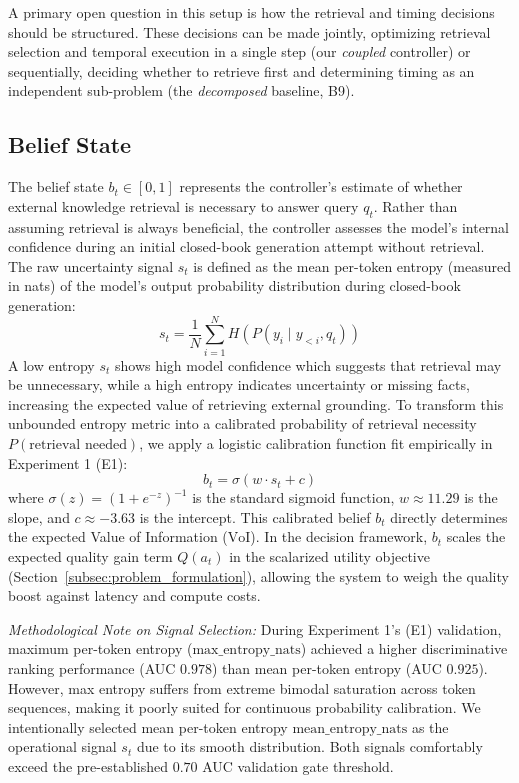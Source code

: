 A primary open question in this setup is how the retrieval and timing decisions should be structured. These decisions can be made jointly, optimizing retrieval selection and temporal execution in a single step (our \textit{coupled} controller) or sequentially, deciding whether to retrieve first and determining timing as an independent sub-problem (the \textit{decomposed} baseline, B9).

\subsection{Belief State}
\label{subsec:belief_state}

The belief state $b_t \in [0, 1]$ represents the controller's estimate of whether external knowledge retrieval is necessary to answer query $q_t$. Rather than assuming retrieval is always beneficial, the controller assesses the model's internal confidence during an initial closed-book generation attempt without retrieval.
The raw uncertainty signal $s_t$ is defined as the mean per-token entropy (measured in nats) of the model's output probability distribution during closed-book generation:
\begin{equation}
s_t = \frac{1}{N} \sum_{i=1}^{N} H(P(y_i \mid y_{<i}, q_t))
\end{equation}
A low entropy $s_t$ shows high model confidence which suggests that retrieval may be unnecessary, while a high entropy indicates uncertainty or missing facts, increasing the expected value of retrieving external grounding.
To transform this unbounded entropy metric into a calibrated probability of retrieval necessity $P(\text{retrieval needed})$, we apply a logistic calibration function fit empirically in Experiment 1 (E1):
\begin{equation}
b_t = \sigma(w \cdot s_t + c)
\end{equation}
where $\sigma(z) = (1 + e^{-z})^{-1}$ is the standard sigmoid function, $w \approx 11.29$ is the slope, and $c \approx -3.63$ is the intercept. This calibrated belief $b_t$ directly determines the expected Value of Information ($\text{VoI}$). In the decision framework, $b_t$ scales the expected quality gain term $Q(a_t)$ in the scalarized utility objective (Section~\ref{subsec:problem_formulation}), allowing the system to weigh the quality boost against latency and compute costs.

\textit{Methodological Note on Signal Selection:} During Experiment 1's (E1) validation, maximum per-token entropy ($\text{max\_entropy\_nats}$) achieved a higher discriminative ranking performance (AUC $0.978$) than mean per-token entropy (AUC $0.925$).
However, max entropy suffers from extreme bimodal saturation across token sequences, making it poorly suited for continuous probability calibration.
We intentionally selected mean per-token entropy $\text{mean\_entropy\_nats}$ as the operational signal $s_t$ due to its smooth distribution. Both signals comfortably exceed the pre-established $0.70$ AUC validation gate threshold.

